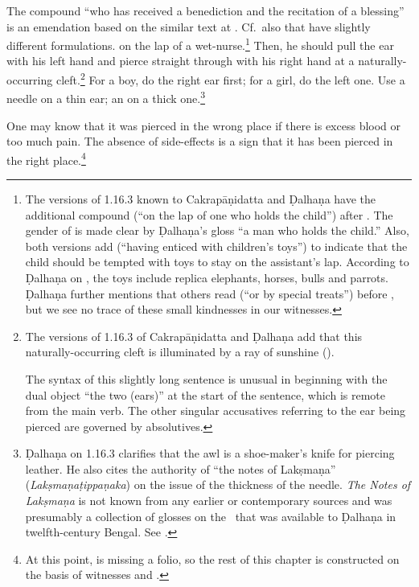 \begin{translation}
{The compound  “who has received a benediction and
the recitation of a blessing” is an emendation based on the similar text at
.  Cf.\ also  that have slightly
different formulations.} on the lap of a wet-nurse.\footnote{The versions of
    1.16.3 known to Cakrapāṇidatta \citep[126]{acar-1939} and Ḍalhaṇa
    \citep[76]{vulgate} have the additional compound  (“on the
    lap of one who holds the child”) after . The gender of
     is made clear by  Ḍalhaṇa's gloss “a man who holds the child.”
    Also, both versions add  (“having enticed with
    children's toys”) to indicate that the child should be tempted with toys to stay
    on the assistant's lap. According to Ḍalhaṇa on , the toys include
    replica elephants, horses, bulls and parrots. Ḍalhaṇa further mentions that others
    read  (“or by special treats”) before
    , but we see no trace of these small kindnesses in our
    witnesses.} Then, he should pull the ear with his left hand 
    and pierce straight through with his right hand at a naturally-occurring
    cleft.\footnote{The versions of 1.16.3 of Cakrapāṇidatta \citep[126]{acar-1939}
        and Ḍalhaṇa \citep[76]{vulgate} add that this naturally-occurring cleft is
        illuminated by a ray of sunshine  ().

The syntax of this slightly long sentence is unusual in beginning with the dual
object  “the two (ears)” at the start of the sentence, which is remote
from the main verb.  The other singular accusatives referring to the ear being
pierced are governed by absolutives.} For a boy, do the right ear first; for a
girl, do the left one. Use a needle on a thin ear; an  on a thick
one.\footnote{Ḍalhaṇa on 1.16.3 \citep[76]{vulgate} clarifies that the awl is a
    shoe-maker's knife for piercing leather.  He also cites the authority of “the
    notes of Lakṣmaṇa” (\emph{Lakṣmaṇaṭippaṇaka}) on the issue of the thickness of the
    needle. \textit{The Notes of Lakṣmaṇa} is not known from any earlier or
    contemporary sources and was presumably a collection of glosses on the \SS\ that
    was available to Ḍalhaṇa in twelfth-century Bengal. See \citet[IA,
    386]{meul-hist}.}
    
    
\item [3]  
    
One may know that it was pierced in the wrong place if there is excess blood or
too much pain. The absence of side-effects is a sign that it has been pierced in the right
place.\footnote{At this point,  is missing a folio, so
    the rest of this chapter is constructed on the basis of witnesses
     and .}
    

\end{translation}
